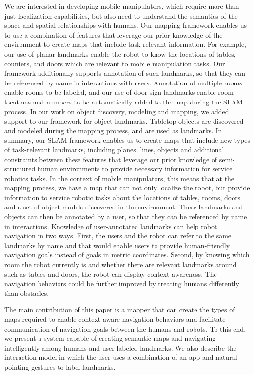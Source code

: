 \documentclass{tADR2e}
\begin{document}
We are interested in developing mobile manipulators, which require more than just localization capabilities, but also need to understand the semantics of the space and spatial relationships with humans. Our mapping framework enables us to use a combination of features that leverage our prior knowledge of the environment to create maps that include task-relevant information. For example, our use of planar landmarks enable the robot to know the locations of tables, counters, and doors which are relevant to mobile manipulation tasks. Our framework additionally supports annotation of such landmarks, so that they can be referenced by name in interactions with users. Annotation of multiple rooms enable rooms to be labeled, and our use of door-sign landmarks enable room locations and numbers to be automatically added to the map during the SLAM process. In our work on object discovery, modeling and mapping, we added support to our framework for object landmarks. Tabletop objects are discovered and modeled during the mapping process, and are used as landmarks. In summary, our SLAM framework enables us to create maps that include new types of task-relevant landmarks, including planes, lines, objects and additional constraints between these features that leverage our prior knowledge of semi-structured human environments to provide necessary information for service robotics tasks. In the context of mobile manipulators, this means that at the mapping process, we have a map that can not only localize the robot, but provide information to service robotic tasks about the locations of tables, rooms, doors and a set of object models discovered in the environment. These landmarks and objects can then be annotated by a user, so that they can be referenced by name in interactions. Knowledge of user-annotated landmarks can help robot navigation in two ways. First, the users and the robot can refer to the same landmarks by name and that would enable users to provide human-friendly navigation goals instead of goals in metric coordinates. Second, by knowing which room the robot currently is and whether there are relevant landmarks around such as tables and doors, the robot can display context-awareness. The navigation behaviors could be further improved by treating humans differently than obstacles.

The main contribution of this paper is a mapper that can create the types of maps required to enable context-aware navigation behaviors and facilitate communication of navigation goals between the humans and robots. To this end, we present a system capable of creating semantic maps and navigating intelligently among humans and user-labeled landmarks. We also describe the interaction model in which the user uses a combination of an app and natural pointing gestures to label landmarks.
\end{document}
